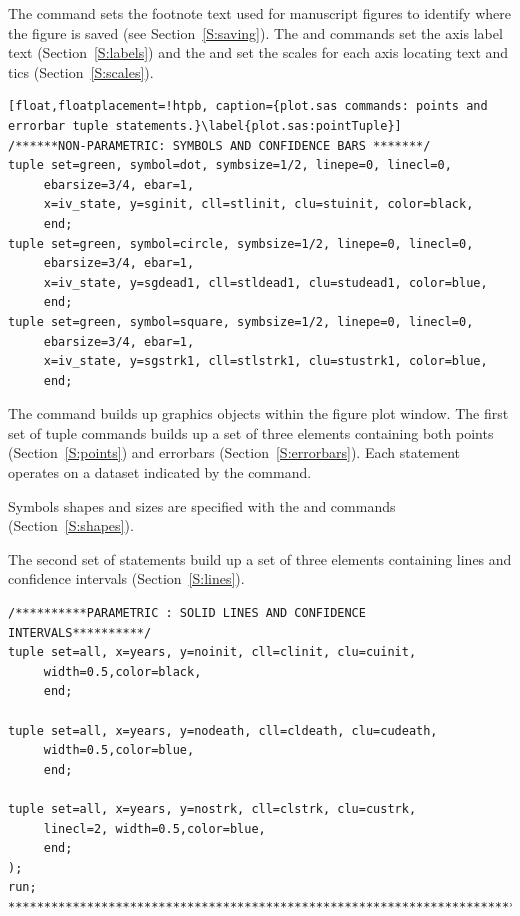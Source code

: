 \documentclass[nojss]{jss}\usepackage[]{graphicx}\usepackage[]{color}
\begin{document}
The  command sets the footnote text used for manuscript figures to identify where the figure is saved (see Section~\ref{S:saving}). The  and  commands set the axis label text (Section~\ref{S:labels}) and the  and  set the scales for each axis locating text and tics (Section~\ref{S:scales}).

\begin{lstlisting}[float,floatplacement=!htpb, caption={plot.sas commands: points and errorbar tuple statements.}\label{plot.sas:pointTuple}]
/******NON-PARAMETRIC: SYMBOLS AND CONFIDENCE BARS *******/
tuple set=green, symbol=dot, symbsize=1/2, linepe=0, linecl=0,
     ebarsize=3/4, ebar=1,
     x=iv_state, y=sginit, cll=stlinit, clu=stuinit, color=black, 
     end;
tuple set=green, symbol=circle, symbsize=1/2, linepe=0, linecl=0,
     ebarsize=3/4, ebar=1,
     x=iv_state, y=sgdead1, cll=stldead1, clu=studead1, color=blue, 
     end;
tuple set=green, symbol=square, symbsize=1/2, linepe=0, linecl=0,
     ebarsize=3/4, ebar=1,
     x=iv_state, y=sgstrk1, cll=stlstrk1, clu=stustrk1, color=blue, 
     end;
\end{lstlisting}
The  command builds up graphics objects within the figure plot window. The first set of tuple commands builds up a set of three elements containing both points (Section~\ref{S:points}) and errorbars (Section~\ref{S:errorbars}). Each  statement operates on a dataset indicated by the  command. 

Symbols shapes and sizes are specified with the  and  commands (Section~\ref{S:shapes}).

The second set of  statements build up a set of three elements containing lines and confidence intervals (Section~\ref{S:lines}).
\begin{lstlisting}[float,floatplacement=!htpb, caption={plot.sas commands: lines tuple statements.}, label={plot.sas:linesTuple}]
/**********PARAMETRIC : SOLID LINES AND CONFIDENCE INTERVALS**********/      
tuple set=all, x=years, y=noinit, cll=clinit, clu=cuinit,
     width=0.5,color=black, 
     end;

tuple set=all, x=years, y=nodeath, cll=cldeath, clu=cudeath,
     width=0.5,color=blue, 
     end;

tuple set=all, x=years, y=nostrk, cll=clstrk, clu=custrk,
     linecl=2, width=0.5,color=blue, 
     end;
);
run;
*****************************************************************************;
\end{lstlisting}
\end{document}
